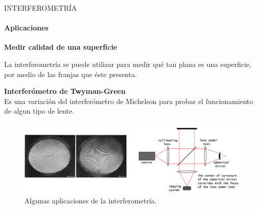 \begin{frame}{INTERFEROMETRÍA}
	\framesubtitle{Aplicaciones}
	\begin{multicols}{2}

	\textbf{Medir calidad de una superficie\\}

	La interferometría se puede utilizar para medir qué tan plana es una superficie, por medio de las franjas que éste presenta.

	\vfill\null

	\textbf{Interferómetro de Twyman-Green\\}
	Es una variación del interferómetro de Michelson para probar el funcionamiento de algun tipo de lente.
\end{multicols}
	\begin{figure}
		\includegraphics[scale=0.4]{juanse/twyy.png}
		\caption{Algunas aplicaciones de la interferometría\footnotemark{}\footnotemark{}.}
	\end{figure}
	\addtocounter{footnote}{-1}
	\addtocounter{footnote}{1}
	\vspace{-1cm}
\end{frame}

